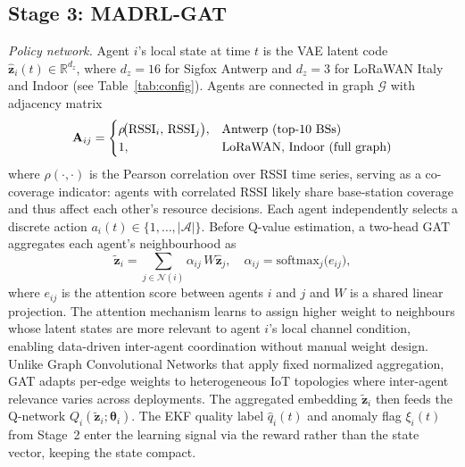 \documentclass[conference]{IEEEtran}
\begin{document}
\subsection{Stage 3: MADRL-GAT}

\textit{Policy network.}
Agent $i$'s local state at time $t$ is the VAE latent code
$\hat{\mathbf{z}}_i(t)\in\mathbb{R}^{d_z}$, where $d_z=16$ for
Sigfox Antwerp and $d_z=3$ for LoRaWAN Italy and Indoor
(see Table~\ref{tab:config}). Agents are connected in graph $\mathcal{G}$ with adjacency matrix
\begin{equation}
\mathbf{A}_{ij} = \begin{cases}
\rho\!\bigl({\rm RSSI}_i,\, {\rm RSSI}_j\bigr), & \text{Antwerp (top-10 BSs)} \\
1, & \text{LoRaWAN, Indoor (full graph)}
\end{cases}
\label{eq:adj}
\end{equation}
where $\rho(\cdot,\cdot)$ is the Pearson correlation over RSSI time series, serving as a co-coverage indicator: agents with correlated RSSI likely share base-station coverage and thus affect each other's resource decisions. Each agent independently selects a discrete action $a_i(t)\in\{1,\ldots,|\mathcal{A}|\}$.
Before Q-value estimation, a two-head GAT~\cite{ref_gat_comm} aggregates each agent's neighbourhood as
\begin{equation}
\tilde{\mathbf{z}}_i = \sum_{j\in\mathcal{N}(i)}\alpha_{ij}\,W\hat{\mathbf{z}}_j,
\quad \alpha_{ij}=\mathrm{softmax}_j\!\bigl(e_{ij}\bigr),
\label{eq:gat}
\end{equation}
where $e_{ij}$ is the attention score between agents $i$ and $j$ and $W$
is a shared linear projection. The attention mechanism learns to assign higher weight to neighbours whose latent states are more relevant to agent $i$'s local channel condition, enabling data-driven inter-agent coordination without manual weight design. Unlike Graph Convolutional Networks that apply fixed normalized aggregation, GAT adapts per-edge weights to heterogeneous IoT topologies where inter-agent relevance varies across deployments.
The aggregated embedding $\tilde{\mathbf{z}}_i$ then feeds the
Q-network $Q_i(\tilde{\mathbf{z}}_i;\bm{\theta}_i)$.
The EKF quality label $\hat{q}_i(t)$ and anomaly flag $\xi_i(t)$ from
Stage~2 enter the learning signal via the reward rather than the state vector,
keeping the state compact.
\end{document}
